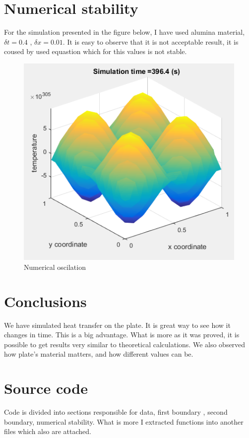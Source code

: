 \documentclass[a4paper,12pt]{article}
\begin{document}
\section{Numerical stability}
For the simulation presented in the figure below, I have used alumina material, $\delta t=0.4$ , $\delta x=0.01$. It is easy to observe that it is not acceptable result, it is coused by used equastion which for this values is not stable.
\begin{figure}[H]
\includegraphics[scale=0.9]{numerical_stability}
\caption{Numerical oscilation}
\centering
\end{figure}

\section{Conclusions}
We have simulated heat transfer on the plate. It is great way to see how it changes in time. This is a big advantage. What is more as it was proved, it is possible to get results very similar to theoretical calculations.
We also observed how plate's material matters, and how different values can be. 
\newpage
\section{Source code}
Code is divided into sections responsible for data, first boundary , second boundary, numerical stability. What is more I extracted functions into another files which also are attached.\\


 


\end{document}
